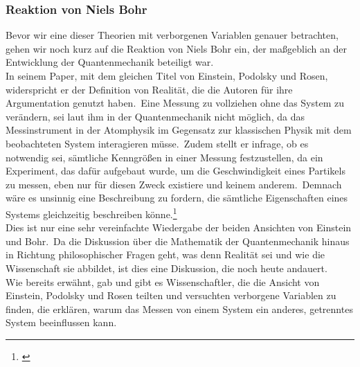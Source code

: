 \subsubsection{Reaktion von Niels Bohr}
\label{subsubsec:reaktion_von_niels_bohr}
Bevor wir eine dieser Theorien mit verborgenen Variablen genauer betrachten, gehen wir noch kurz auf die Reaktion von Niels Bohr ein, der maßgeblich an der Entwicklung der Quantenmechanik beteiligt war.\\
In seinem Paper, mit dem gleichen Titel von Einstein, Podolsky und Rosen, widerspricht er der Definition von Realität, die die Autoren für ihre Argumentation genutzt haben.\ Eine Messung zu vollziehen
ohne das System zu verändern, sei laut ihm in der Quantenmechanik nicht möglich, da das Messinstrument in der Atomphysik im Gegensatz zur klassischen Physik mit dem beobachteten System interagieren müsse.\
Zudem stellt er infrage, ob es notwendig sei, sämtliche Kenngrößen in einer Messung festzustellen, da ein Experiment, das dafür aufgebaut wurde, um die Geschwindigkeit eines Partikels zu messen, eben nur für diesen Zweck
existiere und keinem anderem.\ Demnach wäre es unsinnig eine Beschreibung zu fordern, die sämtliche Eigenschaften eines Systems gleichzeitig beschreiben könne.\footnote{\cite{bohr_1935}}\\
Dies ist nur eine sehr vereinfachte Wiedergabe der beiden Ansichten von Einstein und Bohr.\ Da die Diskussion über die Mathematik der Quantenmechanik hinaus in Richtung philosophischer Fragen geht, was denn Realität sei und wie die Wissenschaft sie abbildet, ist dies eine Diskussion, die noch heute andauert.\\
Wie bereits erwähnt, gab und gibt es Wissenschaftler, die die Ansicht von Einstein, Podolsky und Rosen teilten und versuchten verborgene Variablen zu finden, die erklären, warum das Messen von einem System ein anderes, getrenntes System beeinflussen kann.\\

